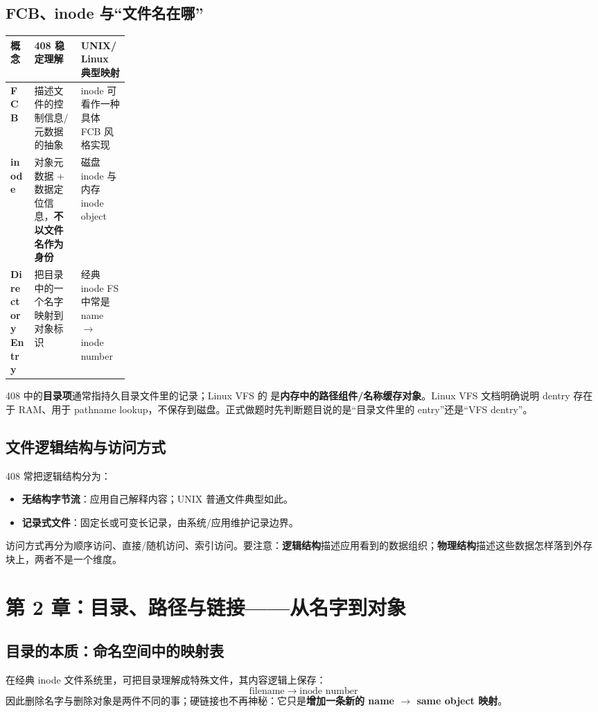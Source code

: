 \documentclass[11pt,a4paper]{ctexart}
\newcommand{\kw}[1]{\textbf{#1}}
\newcommand{\code}[1]{\texttt{\detokenize{#1}}}
\newcommand{\arr}{\;\longrightarrow\;}
\begin{document}
\subsection{FCB、inode 与“文件名在哪”}
\begin{center}
\small
\begin{tabularx}{\linewidth}{>{\bfseries}p{0.20\linewidth} X X}
\toprule
概念 & 408 稳定理解 & UNIX/Linux 典型映射 \\
\midrule
FCB & 描述文件的控制信息/元数据的抽象 & inode 可看作一种具体 FCB 风格实现 \\
inode & 对象元数据 + 数据定位信息，\kw{不以文件名作为身份} & 磁盘 inode 与内存 inode object \\
Directory Entry & 把目录中的一个名字映射到对象标识 & 经典 inode FS 中常是 name $\to$ inode number \\
\bottomrule
\end{tabularx}
\end{center}

\begin{warn}
408 中的\kw{目录项}通常指持久目录文件里的记录；Linux VFS 的 \code{struct dentry} 是\kw{内存中的路径组件/名称缓存对象}。Linux VFS 文档明确说明 dentry 存在于 RAM、用于 pathname lookup，不保存到磁盘。正式做题时先判断题目说的是“目录文件里的 entry”还是“VFS dentry”。
\end{warn}

\subsection{文件逻辑结构与访问方式}
408 常把逻辑结构分为：
\begin{itemize}
  \item \kw{无结构字节流}：应用自己解释内容；UNIX 普通文件典型如此。
  \item \kw{记录式文件}：固定长或可变长记录，由系统/应用维护记录边界。
\end{itemize}
访问方式再分为顺序访问、直接/随机访问、索引访问。要注意：\kw{逻辑结构}描述应用看到的数据组织；\kw{物理结构}描述这些数据怎样落到外存块上，两者不是一个维度。

\section{第 2 章：目录、路径与链接——从名字到对象}

\subsection{目录的本质：命名空间中的映射表}
在经典 inode 文件系统里，可把目录理解成特殊文件，其内容逻辑上保存：
\[
\boxed{\text{filename}\arr\text{inode number}}
\]
因此删除名字与删除对象是两件不同的事；硬链接也不再神秘：它只是\kw{增加一条新的 name $\to$ same object 映射}。
\end{document}
